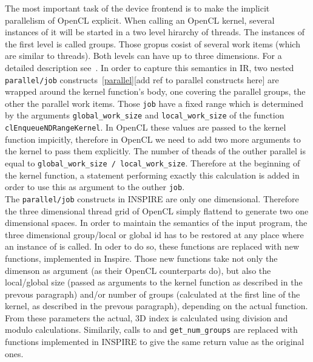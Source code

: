 The most important task of the device frontend is to make the implicit parallelism of OpenCL explicit. When calling an OpenCL kernel, several instances of it will be started in a two level hirarchy of threads. The instances of the first level is called groups. Those gropus cosist of several work items (which are similar to threads). Both levels can have up to three dimensions. For a detailed description see~\cite{oclRef}. In order to capture this semantics in IR, two nested \texttt{parallel/job} constructs~\ref{parallel}[add ref to parallel constructs here] are wrapped around the kernel function's body, one covering the parallel groups, the other the parallel work items. Those \texttt{job} have a fixed range which is determined by the arguments \texttt{global\_work\_size} and \texttt{local\_work\_size} of the function \texttt{clEnqueueNDRangeKernel}. In OpenCL these values are passed to the kernel function impicitly, therefore in OpenCL we need to add two more arguments to the kernel to pass them explicitly. The number of theads of the outher parallel is equal to \texttt{global\_work\_size / local\_work\_size}. Therefore at the beginning of the kernel function, a statement performing exactly this calculation is added in order to use this as argument to the outher \texttt{job}. \\

The \texttt{parallel/job} constructs in INSPIRE are only one dimensional. Therefore the three dimensional thread grid of OpenCL simply flattend to generate two one dimensional spaces. In order to maintain the semantics of the input program, the three dimensional group/local or global id has to be restored at any place where an instance of  is called. In oder to do so, these functions are replaced with new functions, implemented in Inspire. Those new functions take not only the dimenson as argument (as their OpenCL counterparts do), but also the local/global size (passed as arguments to the kernel function as described in the prevous paragraph) and/or number of groups (calculated at the first line of the kernel, as described in the prevous paragraph), depending on the actual function. From these parameters the actual, 3D index is calculated using division and modulo calculations. Similarily, calls to  and \texttt{get\_num\_groups} are replaced with functions implemented in INSPIRE to give the same return value as the original ones. \\


